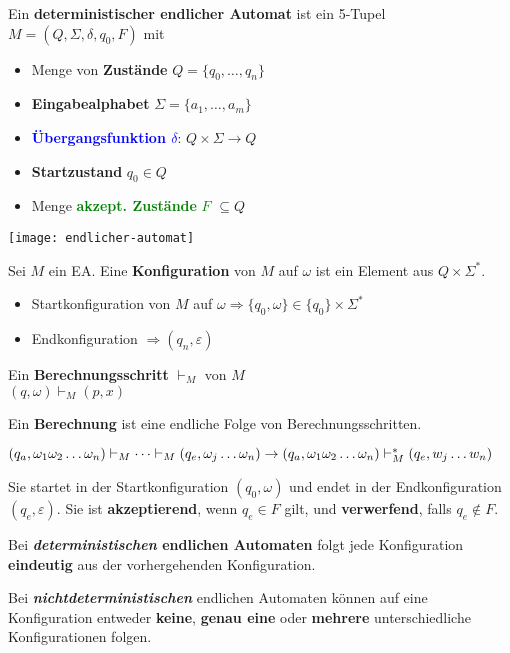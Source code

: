 

Ein \textbf{deterministischer endlicher Automat} ist ein 5-Tupel
$M = (Q, \Sigma, \delta, q_0, F)$ mit
\begin{itemize}
    \item Menge von \textbf{Zustände} $Q = \{ q_0, \dots, q_n\}$
    \item \textbf{Eingabealphabet} $\Sigma = \{a_1, \dots, a_m\}$
    \item \textcolor{blue}{\textbf{Übergangsfunktion $\delta$}}: $Q \times \Sigma \rightarrow Q$
    \item \textbf{Startzustand} $q_0 \in Q$
    \item Menge \textcolor{Green}{\textbf{akzept. Zustände} $F$} $\subseteq Q$
\end{itemize}

\texttt{[image: endlicher-automat]}

Sei $M$ ein EA. Eine \textbf{Konfiguration} von $M$ auf $\omega$ ist ein Element aus $Q \times \Sigma^*$.
\begin{itemize}
    \item Startkonfiguration von $M$ auf $\omega \Rightarrow \{ q_0, \omega \} \in \{ q_0\} \times \Sigma^*$
    \item Endkonfiguration $\Rightarrow (q_n, \varepsilon)$
\end{itemize}

Ein \textbf{Berechnungsschritt} $\vdash_M$ von $M$ \\ $(q, \omega) \vdash_M (p, x)$

Ein \textbf{Berechnung} ist eine endliche Folge von Berechnungsschritten.

$(q_a, \omega_1 \omega_2 \dots \omega_n) \vdash_M \dots \vdash_M (q_e, \omega_j \dots \omega_n) \\ \rightarrow (q_a, \omega_1 \omega_2 \dots \omega_n) \vdash_M^* (q_e, w_j \dots w_n)$

Sie startet in der Startkonfiguration $(q_0, \omega)$ und endet in der Endkonfiguration $(q_e, \varepsilon)$.
Sie ist \textbf{akzeptierend}, wenn $q_e \in F$ gilt, und \textbf{verwerfend}, falls $q_e \notin F$.


Bei \textbf{\emph{deterministischen} endlichen Automaten} folgt jede Konfiguration \textbf{eindeutig} aus der vorhergehenden Konfiguration.

Bei \textbf{\emph{nichtdeterministischen}} endlichen Automaten können auf eine Konfiguration entweder \textbf{keine}, \textbf{genau eine} oder \textbf{mehrere} unterschiedliche Konfigurationen folgen.

